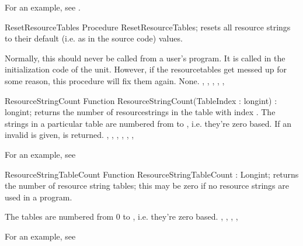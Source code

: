 \documentclass{report}
\begin{document}
For an example, see .

\begin{procedure}{ResetResourceTables}
\Declaration
Procedure ResetResourceTables;
\Description
{} resets all resource strings to their default
(i.e. as in the source code) values.

Normally, this should never be called from a user's program. It is called 
in the initialization code of the  unit. However, if the
resourcetables get messed up for some reason, this procedure will fix them 
again. 
\Errors
None.
\SeeAlso
{},
,
,
,
,
\end{procedure}

\begin{function}{ResourceStringCount}
\Declaration
Function ResourceStringCount(TableIndex : longint) : longint;
\Description
{} returns the number of resourcestrings in
the table with index . The strings in a particular table
are numbered from  to , i.e. they're zero
based.
\Errors
If an invalid  is given,  is returned.
\SeeAlso
{},
,
,
,
,
,
\end{function}

For an example, see 

\begin{function}{ResourceStringTableCount}
\Declaration
Function ResourceStringTableCount : Longint;
\Description
{} returns the number of resource string tables;
this may be zero if no resource strings are used in a program.

The tables are numbered from 0 to , i.e.
they're zero based.
\Errors
\SeeAlso
{},
,
,
,
\end{function}

For an example, see 
\end{document}
